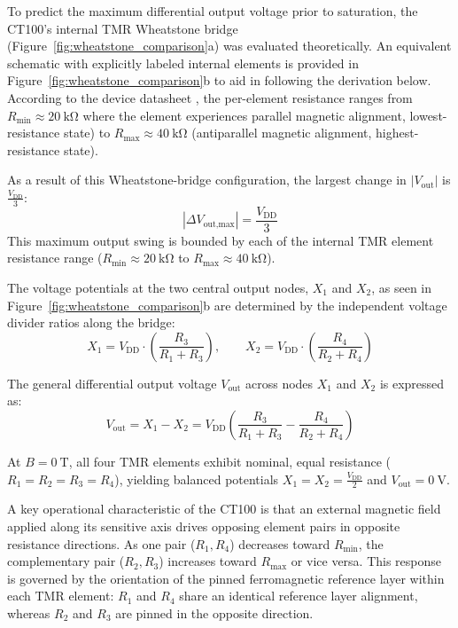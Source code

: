 \documentclass[12pt,a4paper]{article}
\begin{document}
To predict the maximum differential output voltage prior to saturation, the CT100's internal TMR Wheatstone bridge (Figure~\ref{fig:wheatstone_comparison}a) was evaluated theoretically. An equivalent schematic with explicitly labeled internal elements is provided in Figure~\ref{fig:wheatstone_comparison}b to aid in following the derivation below.  According to the device datasheet \cite{ct100_datasheet}, the per-element resistance ranges from $R_{\min} \approx \SI{20}{\kilo\ohm}$ where the element experiences parallel magnetic alignment, lowest-resistance state) to $R_{\max} \approx \SI{40}{\kilo\ohm}$ (antiparallel magnetic alignment, highest-resistance state). 

As a result of this Wheatstone-bridge configuration, the largest change in $\left|V_{\text{out}} \right|$ is $\frac{V_{\text{DD}}}{3}$:
\begin{equation}
   \left| \Delta V_{\text{out,max}} \right| = \frac{V_{\text{DD}}}{3}
\end{equation}
This maximum output swing is bounded by each of the internal TMR element resistance range ($R_{\min} \approx \SI{20}{\kilo\ohm}$ to $R_{\max} \approx \SI{40}{\kilo\ohm}$).

The voltage potentials at the two central output nodes, $X_1$ and $X_2$, as seen in Figure~\ref{fig:wheatstone_comparison}b are determined by the independent voltage divider ratios along the bridge:
\begin{equation}
    X_1 = V_{\text{DD}} \cdot \left( \frac{R_3}{R_1 + R_3} \right), \qquad X_2 = V_{\text{DD}} \cdot \left( \frac{R_4}{R_2 + R_4} \right)
    \label{eq:node_voltages}
\end{equation}

The general differential output voltage $V_{\text{out}}$ across nodes $X_1$ and $X_2$ is expressed as:
\begin{equation}
    V_{\text{out}} = X_1 - X_2 = V_{\text{DD}} \left( \frac{R_3}{R_1 + R_3} - \frac{R_4}{R_2 + R_4} \right)
    \label{eq:vout_general}
\end{equation}

At $B = \SI{0}{\tesla}$, all four TMR elements exhibit nominal, equal resistance ($R_1 = R_2 = R_3 = R_4$), yielding balanced potentials $X_1 = X_2 = \frac{V_{\text{DD}}}{2}$ and $V_{\text{out}} = \SI{0}{\volt}$. 

A key operational characteristic of the CT100 is that an external magnetic field applied along its sensitive axis drives opposing element pairs in opposite resistance directions. As one pair (\(R_1, R_4\)) decreases toward \(R_{\min}\), the complementary pair (\(R_2, R_3\)) increases toward \(R_{\max}\) or vice versa. This response is governed by the orientation of the pinned ferromagnetic reference layer within each TMR element: \(R_1\) and \(R_4\) share an identical reference layer alignment, whereas \(R_2\) and \(R_3\) are pinned in the opposite direction.
\end{document}
